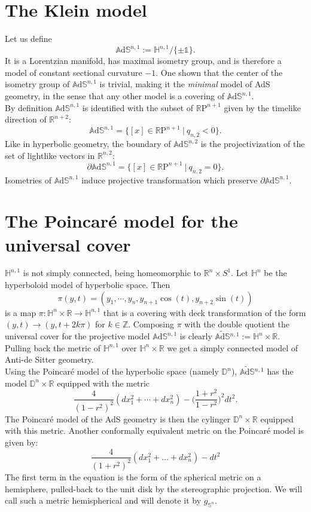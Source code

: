 \documentclass[10pt,a4paper,oneside,reqno]{book}
\def\R{\mathbb{R}}
\def\Z{\mathbb{Z}}
\def\H{\mathbb{H}}
\def\A{\mathbb{A}\mathrm{d}\mathbb{S}}
\def\D{\mathbb{D}}
\def\AS{\widetilde{\mathbb{A}\mathrm{d}\mathbb{S}}{}}
\def\1{\mathds{1}}
\theoremstyle{plain}
\theoremstyle{definition}
\theoremstyle{plain}
\theoremstyle{plain}
\theoremstyle{mystyleNormalFont}
\begin{document}
\section{The Klein model}
Let us define
\[
\A^{n,1} := \H^{n,1} / \{ \pm \1 \}.
\]
It is a Lorentzian manifold, has maximal isometry group, and is therefore a model of constant sectional curvature $-1$.
One shown that the center of the isometry group of $\A^{n,1}$ is trivial, making it the \emph{minimal} model of AdS geometry, in the sense that any other model is a covering of $\A^{n,1}$.\\
By definition $\A^{n,1}$ is identified with the subset of $\mathbb{R} \text{P}^{n+1}$ given by the timelike direction of $\R^{n+2}$:
\[
\A^{n,1} = \{ \left[ x \right]\in \mathbb{R} \text{P}^{n+1} \ | \ q_{n,2}<0  \}.
\]
Like in hyperbolic geometry, the boundary of $\A^{n,2}$ is the projectivization of the set of lightlike vectors in $\R^{n,2}$:
\[
\partial\A^{n,1} = \{ \left[ x \right]\in \mathbb{R} \text{P}^{n+1} \ | \ q_{n,2}=0  \}.
\]
Isometries of $\A^{n,1}$ induce projective transformation which preserve $\partial \A^{n,1}$.\\

\section{The Poincaré model for the universal cover}
$\H^{n,1}$ is not simply connected, being homeomorphic to $\R^n \times S^1$.
Let $\H^n$ be the hyperboloid model of hyperbolic space. Then
\[
\pi(y,t) = (y_1 , \cdots , y_n, y_{n+1} \cos(t) , y_{n+2} \sin(t))
\]
is a map $\pi : \H^n \times \R \to \H^{n,1}$ that is a covering with deck transformation of the form $(y,t) \to (y, t+2k\pi)$ for $k \in \Z$. Composing $\pi$ with the double quotient the universal cover for the projective model $\A^{n,1}$ is clearly  $\AS ^{n,1} :=  \H^n \times \R$.\\
Pulling back the metric of $\H^{n,1}$ over $\H^n \times \R$ we get a simply connected model of Anti-de Sitter geometry.\\
Using the Poincaré model of the hyperbolic space (namely $\D^n$), $\AS^{n,1}$ has the model $\D^n \times \R$ equipped with the metric
\[
    \frac{4}{(1-r^2)^2} (dx_1^2 + \cdots + dx_n^2) - \Big( \frac{1+r^2}{1-r^2} \Big)^2 dt^2.
\]
The Poincaré model of the AdS geometry is then the cylinger $\D^n \times \R$ equipped with this metric.
Another conformally equivalent metric on the Poincaré model is given by:
\begin{equation}\label{emispherical}
    \frac{4}{(1+r^2)^2}(dx_1^2+\dots+dx_n^2)-dt^2
\end{equation}
The first term in the equation is the form of the spherical metric on a hemisphere, pulled-back to the unit disk by the stereographic projection.
We will call such a metric hemispherical and will denote it by $g_{\mathbb{S}^n}$. 
\end{document}
